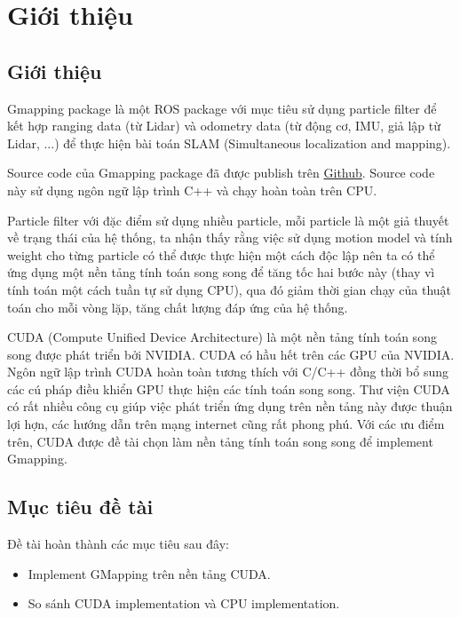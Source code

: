\documentclass[../../main.tex]{subfiles}
\begin{document}
\chapter{Giới thiệu}

\section{Giới thiệu}
Gmapping package là một ROS package với mục tiêu sử dụng particle filter để kết hợp ranging data (từ Lidar) và odometry data (từ động cơ, IMU, giả lập từ Lidar, ...) để  thực hiện bài toán SLAM (Simultaneous localization and mapping).

Source code của Gmapping package đã được publish trên \href{https://github.com/ros-perception/slam_gmapping.}{Github}. Source code này sử dụng ngôn ngữ lập trình C++ và chạy hoàn toàn trên CPU.

Particle filter với đặc điểm sử dụng nhiều particle, mỗi particle là một giả thuyết về trạng thái của hệ thống, ta nhận thấy rằng việc sử dụng motion model và tính weight cho từng particle có thể được thực hiện một cách độc lập nên ta có thể ứng dụng một nền tảng tính toán song song để tăng tốc hai bước này (thay vì tính toán một cách tuần tự sử dụng CPU), qua đó giảm thời gian chạy của thuật toán cho mỗi vòng lặp, tăng chất lượng đáp ứng của hệ thống.

CUDA (Compute Unified Device Architecture) là một nền tảng tính toán song song được phát triển bởi NVIDIA. CUDA có hầu hết trên các GPU của NVIDIA. Ngôn ngữ lập trình CUDA hoàn toàn tương thích với C/C++ đồng thời bổ  sung các cú pháp điều khiển GPU thực hiện các tính toán song song. Thư viện CUDA có rất nhiều công cụ giúp việc phát triển ứng dụng trên nền tảng này được thuận lợi hợn, các hướng dẫn trên mạng internet cũng rất phong phú. Với các ưu điểm trên, CUDA được đề tài chọn làm nền tảng tính toán song song để implement Gmapping.

\section{Mục tiêu đề tài}
Đề tài hoàn thành các mục tiêu sau đây:
\begin{itemize}
    \item Implement GMapping trên nền tảng CUDA.
    \item So sánh CUDA implementation và CPU implementation.
\end{itemize}
\end{document}
